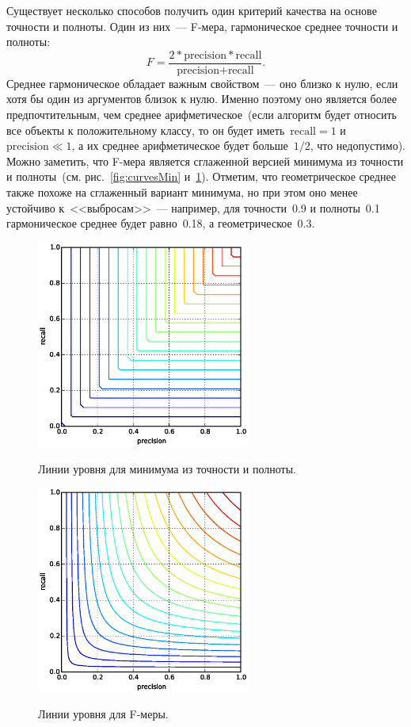 \documentclass[12pt,fleqn]{article}
\begin{document}
Существует несколько способов получить один критерий качества
на основе точности и полноты.
Один из них~--- F-мера, гармоническое среднее точности и полноты:
\[
    F
    =
    \frac{
        2 * \text{precision} * \text{recall}
    }{
        \text{precision} + \text{recall}
    }.
\]
Среднее гармоническое обладает важным свойством~--- оно близко к нулю, если хотя бы
один из аргументов близок к нулю.
Именно поэтому оно является более предпочтительным, чем среднее арифметическое~(если
алгоритм будет относить все объекты к положительному классу,
то он будет иметь~$\text{recall} = 1$ и~$\text{precision} \ll 1$,
а их среднее арифметическое будет больше~$1/2$, что недопустимо).
Можно заметить, что F-мера является сглаженной версией минимума
из точности и полноты~(см. рис.~\ref{fig:curvesMin} и~\ref{fig:curvesHarmonic}).
Отметим, что геометрическое среднее также похоже на сглаженный вариант минимума,
но при этом оно менее устойчиво к~<<выбросам>>~--- например, для точности~0.9
и полноты~0.1 гармоническое среднее будет равно~0.18, а геометрическое~0.3.

\begin{figure}[t]
  \begin{multicols}{2}
    \hfill
    \includegraphics[width=70mm]{precision_recall_min.eps}
    \hfill
    \caption{Линии уровня для минимума из точности и полноты.}
    \label{fig:curvesMin}
    \hfill
    \includegraphics[width=70mm]{precision_recall_harmonic.eps}
    \hfill
    \caption{Линии уровня для F-меры.}
    \label{fig:curvesHarmonic}
  \end{multicols}
\end{figure}
\end{document}
